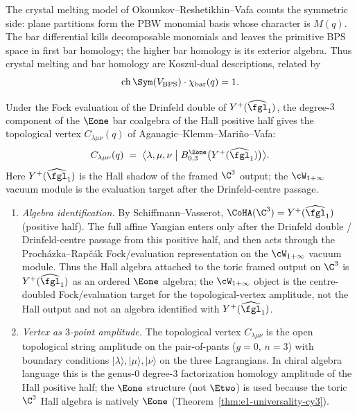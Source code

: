 \begin{remark}
\label{rem:crystal-melting-bar}
The crystal melting model of Okounkov--Reshetikhin--Vafa counts the
symmetric side: plane partitions form the PBW monomial basis whose
character is \(M(q)\). The bar differential kills decomposable
monomials and leaves the primitive BPS space in first bar homology; the
higher bar homology is its exterior algebra. Thus crystal melting and
bar homology are Koszul-dual descriptions, related by
\[
 \mathrm{ch}\,\Sym(V_{\mathrm{BPS}})\cdot
 \chi_{\mathrm{bar}}(q)=1.
\]
\end{remark}


\begin{proposition}
\label{prop:topological-vertex-e1-amplitude}
Under the Fock evaluation of the Drinfeld double of
\(Y^+(\widehat{\fgl}_1)\), the degree-\(3\) component of the
\(\Eone\) bar coalgebra of the Hall positive half gives the topological vertex
\(C_{\lambda\mu\nu}(q)\) of Aganagic--Klemm--Mari\~{n}o--Vafa:
\[
 C_{\lambda\mu\nu}(q) \;=\; \bigl\langle \lambda,\mu,\nu \bigm|
 B^{\Eone}_{0,3}\bigl(Y^+(\widehat{\fgl}_1)\bigr) \bigr\rangle.
\]
Here \(Y^+(\widehat{\fgl}_1)\) is the Hall shadow of the framed
\(\C^3\) output; the
\(\cW_{1+\infty}\) vacuum module is the evaluation target after the
Drinfeld-centre passage.
\begin{enumerate}[label=\textup{(\alph*)}]
 \item \emph{Algebra identification.} By Schiffmann--Vasserot, $\CoHA(\C^3) = Y^+(\widehat{\fgl}_1)$ (positive half). The full affine Yangian enters only after the Drinfeld double / Drinfeld-centre passage from this positive half, and then acts through the Proch\'azka--Rap\v{c}\'ak Fock/evaluation representation on the $\cW_{1+\infty}$ vacuum module. Thus the Hall algebra attached to the toric framed output on $\C^3$ is $Y^+(\widehat{\fgl}_1)$ as an ordered $\Eone$ algebra; the $\cW_{1+\infty}$ object is the centre-doubled Fock/evaluation target for the topological-vertex amplitude, not the Hall output and not an algebra identified with $Y^+(\widehat{\fgl}_1)$.
 \item \emph{Vertex as $3$-point amplitude.} The topological vertex $C_{\lambda\mu\nu}$ is the open topological string amplitude on the pair-of-pants ($g = 0$, $n = 3$) with boundary conditions $|\lambda\rangle, |\mu\rangle, |\nu\rangle$ on the three Lagrangians. In chiral algebra language this is the genus-$0$ degree-$3$ factorization homology amplitude of the Hall positive half; the $\Eone$ structure (not $\Etwo$) is used because the toric $\C^3$ Hall algebra is natively $\Eone$ (Theorem~\ref{thm:e1-universality-cy3}).

\end{enumerate}
\end{proposition}
